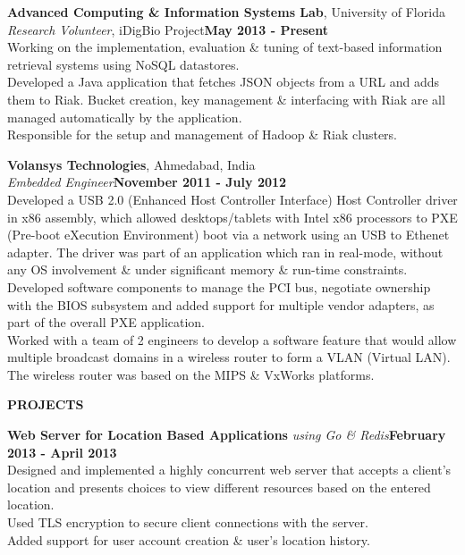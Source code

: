 \documentclass[10pt]{article}
\begin{document}
{\bf Advanced Computing \& Information Systems Lab}, University of Florida\\
\textit{Research Volunteer}, iDigBio Project\hfill{\bf May 2013 - Present} \smallskip \\
Working on the implementation, evaluation \& tuning of text-based information retrieval systems using NoSQL datastores. \smallskip \\
Developed a Java application that fetches JSON objects from a URL and adds them to Riak. Bucket creation, key management \& interfacing with Riak are all managed automatically by the application. \smallskip \\
Responsible for the setup and management of Hadoop \& Riak clusters. %

{\bf Volansys Technologies}, Ahmedabad, India\\
\textit{Embedded Engineer}\hfill{\bf November 2011 - July 2012} \smallskip \\
Developed a USB 2.0 (Enhanced Host Controller Interface) Host Controller driver in x86 assembly, which allowed desktops/tablets with Intel x86 processors to PXE (Pre-boot eXecution Environment) boot via a network using an USB to Ethenet adapter. The driver was part of an application which ran in real-mode, without any OS involvement \& under significant memory \& run-time constraints. \smallskip \\
Developed software components to manage the PCI bus, negotiate ownership with the BIOS subsystem and added support for multiple vendor adapters, as part of the overall PXE application. \smallskip \\
Worked with a team of 2 engineers to develop a software feature that would allow multiple broadcast domains in a wireless router to form a VLAN (Virtual LAN). The wireless router was based on the MIPS \& VxWorks platforms.

\MakeUppercase{\bf Projects}

{\bf Web Server for Location Based Applications} \textit{using Go \& Redis}\hfill{\bf February 2013 - April 2013} \smallskip \\
Designed and implemented a highly concurrent web server that accepts a client's location and presents choices to view different resources based on the entered location. \smallskip \\
Used TLS encryption to secure client connections with the server. \smallskip \\
Added support for user account creation \& user's location history. %
\end{document}
